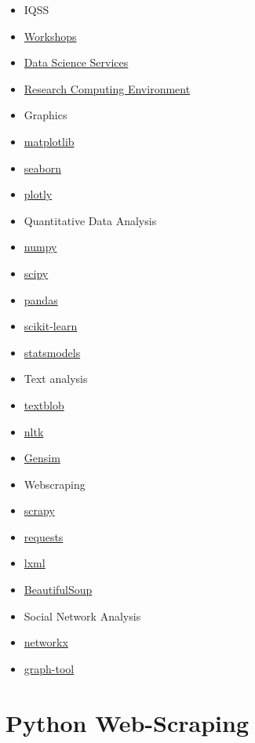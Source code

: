\documentclass[]{book}
\begin{document}
\begin{itemize}
\item
  IQSS
\item
  \href{https://dss.iq.harvard.edu/workshop-materials}{Workshops}
\item
  \href{https://dss.iq.harvard.edu/}{Data Science Services}
\item
  \href{https://iqss.github.io/dss-rce/}{Research Computing Environment}
\item
  Graphics
\item
  \href{https://matplotlib.org/}{matplotlib}
\item
  \href{https://seaborn.pydata.org/}{seaborn}
\item
  \href{https://plot.ly/python/}{plotly}
\item
  Quantitative Data Analysis
\item
  \href{http://www.numpy.org/}{numpy}
\item
  \href{https://www.scipy.org/}{scipy}
\item
  \href{https://pandas.pydata.org/}{pandas}
\item
  \href{http://scikit-learn.org/stable/}{scikit-learn}
\item
  \href{http://www.statsmodels.org/stable/}{statsmodels}
\item
  Text analysis
\item
  \href{https://textblob.readthedocs.io/en/dev/}{textblob}
\item
  \href{http://www.nltk.org/}{nltk}
\item
  \href{https://radimrehurek.com/gensim/}{Gensim}
\item
  Webscraping
\item
  \href{https://scrapy.org/}{scrapy}
\item
  \href{http://docs.python-requests.org/en/master/}{requests}
\item
  \href{https://lxml.de/}{lxml}
\item
  \href{https://www.crummy.com/software/BeautifulSoup/}{BeautifulSoup}
\item
  Social Network Analysis
\item
  \href{https://networkx.github.io/}{networkx}
\item
  \href{https://graph-tool.skewed.de/}{graph-tool}
\end{itemize}

\chapter{Python Web-Scraping}\label{python-web-scraping}
\end{document}
